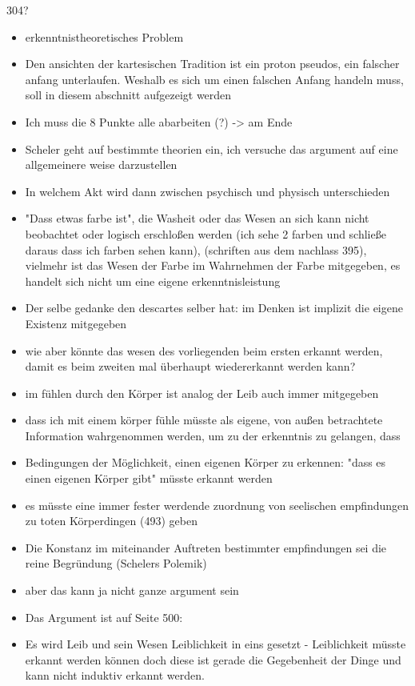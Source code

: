 \documentclass[a4paper, 12pt]{article}
\begin{document}
\begin{onehalfspace}

304? 

\begin{itemize}
  \item erkenntnistheoretisches Problem
  \item Den ansichten der kartesischen Tradition ist ein proton pseudos, ein falscher anfang unterlaufen. Weshalb es sich um einen falschen Anfang handeln muss, soll in diesem abschnitt aufgezeigt werden
  \item Ich muss die 8 Punkte alle abarbeiten (?) -> am Ende
  \item Scheler geht auf bestimmte theorien ein, ich versuche das argument auf eine allgemeinere weise darzustellen
  \item In welchem Akt wird dann zwischen psychisch und physisch unterschieden
  \item "Dass etwas farbe ist", die Washeit oder das Wesen an sich kann nicht beobachtet oder logisch erschloßen werden (ich sehe 2 farben und schließe daraus dass ich farben sehen kann), (schriften aus dem nachlass 395), vielmehr ist das Wesen der Farbe im Wahrnehmen der Farbe mitgegeben, es handelt sich nicht um eine eigene erkenntnisleistung
  \item Der selbe gedanke den descartes selber hat: im Denken ist implizit die eigene Existenz mitgegeben
  \item wie aber könnte das wesen des vorliegenden beim ersten erkannt werden, damit es beim zweiten mal überhaupt wiedererkannt werden kann?
  \item im fühlen durch den Körper ist analog der Leib auch immer mitgegeben
  \item dass ich mit einem körper fühle müsste als eigene, von außen betrachtete Information wahrgenommen werden, um zu der erkenntnis zu gelangen, dass 
  \item Bedingungen der Möglichkeit, einen eigenen Körper zu erkennen: "dass es einen eigenen Körper gibt" müsste erkannt werden
  \item es müsste eine immer fester werdende zuordnung von seelischen empfindungen zu toten Körperdingen (493) geben
  \item Die Konstanz im miteinander Auftreten bestimmter empfindungen sei die reine Begründung (Schelers Polemik)
  \item aber das kann ja nicht ganze argument sein
  \item Das Argument ist auf Seite 500:
  \item Es wird Leib und sein Wesen Leiblichkeit in eins gesetzt - Leiblichkeit müsste erkannt werden können doch diese ist gerade die Gegebenheit der Dinge und kann nicht induktiv erkannt werden.

\end{itemize}
\end{onehalfspace}
\end{document}
